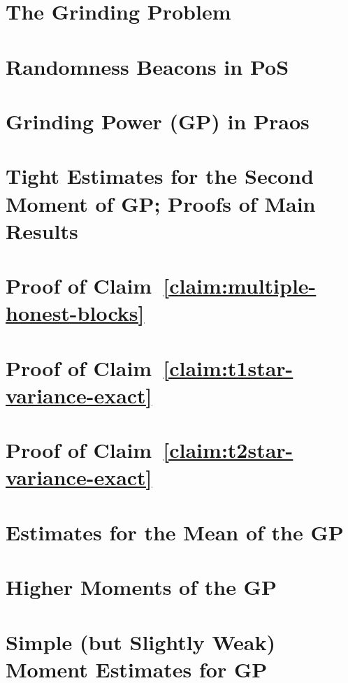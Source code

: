 \chapter{The Grinding Problem}\label{ch:grinding-intro}


\chapter{Randomness Beacons in PoS}\label{sec:model-grinding}


% 

\chapter{Grinding Power (GP) in Praos}\label{sec:praos}



\chapter{Tight Estimates for the Second Moment of GP; Proofs of Main Results}\label{sec:praos-second-moment}\label{sec:main-theorems}




\chapter{Proof of Claim~\ref{claim:multiple-honest-blocks}}\label{sec:praos-claim-multiple-honest-blocks}



\chapter{Proof of Claim~\ref{claim:t1star-variance-exact}}\label{sec:praos-claim-t1star-variance-exact}



\chapter{Proof of Claim~\ref{claim:t2star-variance-exact}}\label{sec:praos-claim-t2star-variance-exact}



\chapter{Estimates for the Mean of the GP}



\chapter{Higher Moments of the GP}



\chapter{Simple (but Slightly Weak) Moment Estimates for GP}\label{app:grinding-praos}




